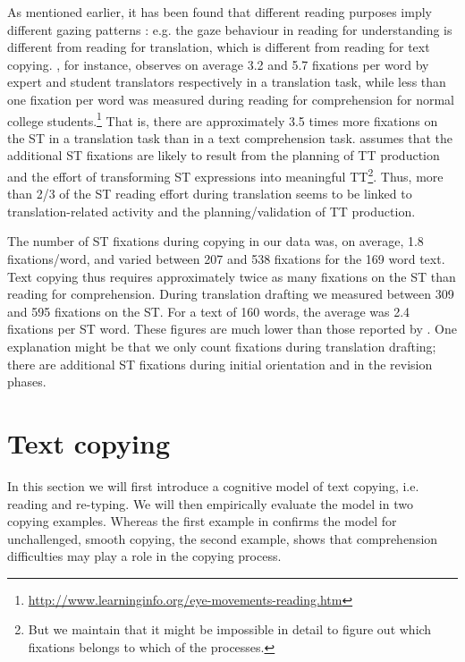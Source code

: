 \documentclass[output=paper]{LSP/langsci}
\begin{document}
As mentioned earlier, it has been found that different reading purposes imply different gazing patterns \citep{Jakobsen2008}: e.g. the gaze behaviour in reading for understanding is different from reading for translation, which is different from reading for text copying. \citet{Dragsted2010}, for instance, observes on average 3.2 and 5.7 fixations per word by expert and student translators respectively in a translation task, while less than one fixation per word was measured during reading for comprehension for normal college students.\footnote{\url{http://www.learninginfo.org/eye-movements-reading.htm}} That is, there are approximately 3.5 times more fixations on the ST in a translation task than in a text comprehension task. \citeauthor{Dragsted2010} assumes that the additional ST fixations are likely to result from the planning of TT production and the effort of transforming ST expressions into meaningful TT\footnote{But we maintain that it might be impossible in detail to figure out which fixations belongs to which of the processes.}. Thus, more than 2/3 of the ST reading effort during translation seems to be linked to translation-related activity and the planning/validation of TT production. 

The number of ST fixations during copying in our data was, on average, 1.8 fixations/word, and varied between 207 and 538 fixations for the 169 word text. Text copying thus requires approximately twice as many fixations on the ST than reading for comprehension. During translation drafting we measured between 309 and 595 fixations on the ST. For a text of 160 words, the average was 2.4 fixations per ST word. These figures are much lower than those reported by \citet{Dragsted2010}. One explanation might be that we only count fixations during translation drafting; there are additional ST fixations during initial orientation and in the revision phases.


\section{Text copying}\label{sec:carl:3}
 
In this section we will first introduce a cognitive model of text copying, i.e. reading and re-typing. We will then empirically evaluate the model in two copying examples. Whereas the first example in  confirms the model for unchallenged, smooth copying, the second example,  shows that comprehension difficulties may play a role in the copying process.
\end{document}

